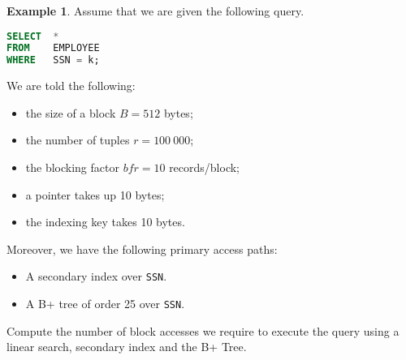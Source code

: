 \documentclass[a4paper, openany]{memoir}
\theoremstyle{definition}
\newtheorem{example}[subsection]{Example}
\begin{document}
\begin{example}
    Assume that we are given the following query.
\begin{lstlisting}[language=SQL]
SELECT  *
FROM    EMPLOYEE
WHERE   SSN = k;
\end{lstlisting}
    We are told the following:
    \begin{itemize}
        \item the size of a block $B = 512$ bytes;
        \item the number of tuples $r = 100 \ 000$;
        \item the blocking factor $\textit{bfr} = 10$ records/block;
        \item a pointer takes up 10 bytes;
        \item the indexing key takes 10 bytes.
    \end{itemize}
    Moreover, we have the following primary access paths:
    \begin{itemize}
        \item A secondary index over \texttt{SSN}.
        \item A B+ tree of order 25 over \texttt{SSN}.
    \end{itemize}
    Compute the number of block accesses we require to execute the query using a linear search, secondary index and the B+ Tree.
\end{example}
\end{document}
